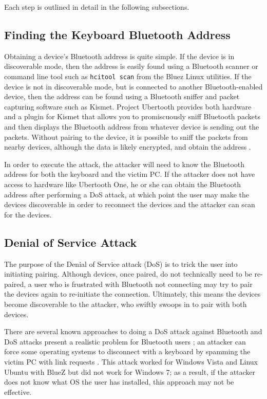 \documentclass{acm_proc_article-sp}
\begin{document}
Each step is outlined in detail in the following subsections.

\subsection{Finding the Keyboard Bluetooth Address}
Obtaining a device's Bluetooth address is quite simple. If the device is in discoverable mode, then the address is easily found using a Bluetooth scanner or command line tool such as \texttt{hcitool scan} from the Bluez Linux utilities. If the device is not in discoverable mode, but is connected to another Bluetooth-enabled device, then the address can be found using a Bluetooth sniffer and packet capturing software such as Kismet\cite{kismet}. Project Ubertooth \cite{ubertooth} provides both hardware and a plugin for Kismet that allows you to promiscuously sniff Bluetooth packets and then displays the Bluetooth address from whatever device is sending out the packets. Without pairing to the device, it is possible to sniff the packets from nearby devices, although the data is likely encrypted, and obtain the address \cite{hak5}. 

In order to execute the attack, the attacker will need to know the Bluetooth address for both the keyboard and the victim PC. If the attacker does not have access to hardware like Ubertooth One, he or she can obtain the Bluetooth address after performing a DoS attack, at which point the user may make the devices discoverable in order to reconnect the devices and the attacker can scan for the devices. 

\subsection{Denial of Service Attack}
The purpose of the Denial of Service attack (DoS) is to trick the user into initiating pairing. Although devices, once paired, do not technically need to be re-paired, a user who is frustrated with Bluetooth not connecting may try to pair the devices again to re-initiate the connection. Ultimately, this means the devices become discoverable to the attacker, who swiftly swoops in to pair with both devices. 

There are several known approaches to doing a DoS attack against Bluetooth and DoS attacks present a realistic problem for Bluetooth users \cite{bandyopadhyay2010information}; an attacker can force some operating systems to disconnect with a keyboard by spamming the victim PC with link requests \cite{cuthbertbluetooth}. This attack worked for Windows Vista and Linux Ubuntu with BlueZ but did not work for Windows 7; as a result, if the attacker does not know what OS the user has installed, this approach may not be effective. 
\end{document}
